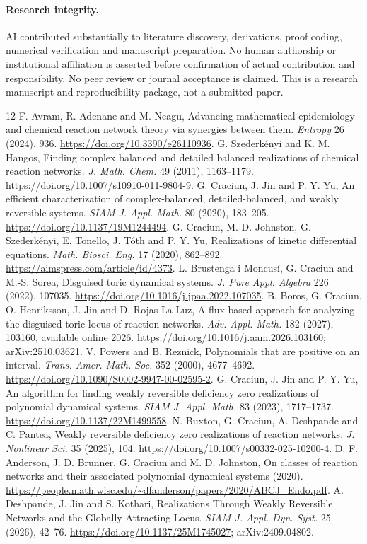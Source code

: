 \documentclass[11pt]{article}
\begin{document}
\paragraph{Research integrity.} AI contributed substantially to literature discovery, derivations, proof coding, numerical verification and manuscript preparation. No human authorship or institutional affiliation is asserted before confirmation of actual contribution and responsibility. No peer review or journal acceptance is claimed. This is a research manuscript and reproducibility package, not a submitted paper.

\begin{thebibliography}{12}
 F. Avram, R. Adenane and M. Neagu, Advancing mathematical epidemiology and chemical reaction network theory via synergies between them. \emph{Entropy} 26 (2024), 936. \url{https://doi.org/10.3390/e26110936}.
 G. Szederk\'enyi and K. M. Hangos, Finding complex balanced and detailed balanced realizations of chemical reaction networks. \emph{J. Math. Chem.} 49 (2011), 1163--1179. \url{https://doi.org/10.1007/s10910-011-9804-9}.
 G. Craciun, J. Jin and P. Y. Yu, An efficient characterization of complex-balanced, detailed-balanced, and weakly reversible systems. \emph{SIAM J. Appl. Math.} 80 (2020), 183--205. \url{https://doi.org/10.1137/19M1244494}.
 G. Craciun, M. D. Johnston, G. Szederk\'enyi, E. Tonello, J. T\'oth and P. Y. Yu, Realizations of kinetic differential equations. \emph{Math. Biosci. Eng.} 17 (2020), 862--892. \url{https://aimspress.com/article/id/4373}.
 L. Brustenga i Moncus\'i, G. Craciun and M.-S. Sorea, Disguised toric dynamical systems. \emph{J. Pure Appl. Algebra} 226 (2022), 107035. \url{https://doi.org/10.1016/j.jpaa.2022.107035}.
 B. Boros, G. Craciun, O. Henriksson, J. Jin and D. Rojas La Luz, A flux-based approach for analyzing the disguised toric locus of reaction networks. \emph{Adv. Appl. Math.} 182 (2027), 103160, available online 2026. \url{https://doi.org/10.1016/j.aam.2026.103160}; arXiv:2510.03621.
 V. Powers and B. Reznick, Polynomials that are positive on an interval. \emph{Trans. Amer. Math. Soc.} 352 (2000), 4677--4692. \url{https://doi.org/10.1090/S0002-9947-00-02595-2}.
 G. Craciun, J. Jin and P. Y. Yu, An algorithm for finding weakly reversible deficiency zero realizations of polynomial dynamical systems. \emph{SIAM J. Appl. Math.} 83 (2023), 1717--1737. \url{https://doi.org/10.1137/22M1499558}.
 N. Buxton, G. Craciun, A. Deshpande and C. Pantea, Weakly reversible deficiency zero realizations of reaction networks. \emph{J. Nonlinear Sci.} 35 (2025), 104. \url{https://doi.org/10.1007/s00332-025-10200-4}.
 D. F. Anderson, J. D. Brunner, G. Craciun and M. D. Johnston, On classes of reaction networks and their associated polynomial dynamical systems (2020). \url{https://people.math.wisc.edu/~dfanderson/papers/2020/ABCJ_Endo.pdf}.
 A. Deshpande, J. Jin and S. Kothari, Realizations Through Weakly Reversible Networks and the Globally Attracting Locus. \emph{SIAM J. Appl. Dyn. Syst.} 25 (2026), 42--76. \url{https://doi.org/10.1137/25M1745027}; arXiv:2409.04802.
\end{thebibliography}
\end{document}
